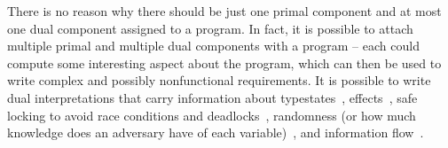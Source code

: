 \documentclass[preprint]{sig-alternate-05-2015}
\begin{document}
There is no reason why there should be just one primal
component and at most one dual component assigned
to a program. In fact, it is possible
to attach multiple primal and multiple dual components with
a program -- each could compute some interesting aspect about the
program, which can then be used to write complex and
possibly nonfunctional requirements.
It is possible to write dual interpretations that
carry information about
typestates~\cite{DBLP:journals/tse/StromY86},
effects~\cite{DBLP:conf/popl/LucassenG88},
safe locking to avoid race conditions and
deadlocks~\cite{DBLP:journals/toplas/AbadiFF06},
randomness (or how much knowledge does an adversary have
of each variable)~\cite{DBLP:conf/csfw/MalozemoffKG14},
and information flow~\cite{DBLP:journals/jsac/SabelfeldM03}.
\end{document}
